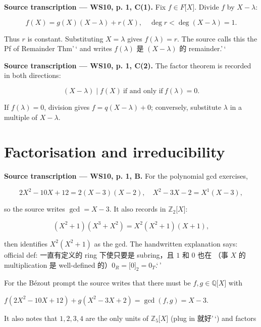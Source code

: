 \textbf{Source transcription --- WS10, p. 1, C(1).} Fix \(f \in F\lbrack X\rbrack\). Divide \(f\) by \(X - \lambda\):

\[f(X) = g(X)\left( {X - \lambda} \right) + r(X),\quad\deg r < \deg\left( {X - \lambda} \right) = 1.\]

Thus \(r\) is constant. Substituting \(X = \lambda\) gives \(f(\lambda) = r\). The source calls this the Pf of Remainder Thm'\,` and writes \(f(\lambda)\) 是 \(\left( {X - \lambda} \right)\) 的 remainder.'\,`

\textbf{Source transcription --- WS10, p. 1, C(2).} The factor theorem is recorded in both directions:

\[\left. \left( {X - \lambda} \right) \middle| f(X)\ \text{if and only if}\ f(\lambda) = 0. \right.\]

If \(f(\lambda) = 0\), division gives \(f = q\left( {X - \lambda} \right) + 0\); conversely, substitute \(\lambda\) in a multiple of \(X - \lambda\).

\section{Factorisation and irreducibility}

\textbf{Source transcription --- WS10, p. 1, B.} For the polynomial gcd exercises,

\[2X^{2} - 10X + 12 = 2\left( {X - 3} \right)\left( {X - 2} \right),\quad X^{2} - 3X - 2 = X^{1}\left( {X - 3} \right),\]

so the source writes \(\gcd = X - 3\). It also records in \(\mathbb{Z}_{2}\lbrack X\rbrack\):

\[\left( {X^{2} + 1} \right)\left( {X^{3} + X^{2}} \right) = X^{2}\left( {X^{2} + 1} \right)\left( {X + 1} \right),\]

then identifies \(X^{2}\left( {X^{2} + 1} \right)\) as the gcd. The handwritten explanation says: official def: 一直有定义的 ring 下使只要是 subring，且 \(1\) 和 \(0\) 也在 （事 \(X\) 的 multiplication 是 well-defined 的）\(0_{R} = \lbrack 0\rbrack_{2} = 0_{T}\).`\,'

For the Bézout prompt the source writes that there must be \(f,g \in \mathbb{Q}\lbrack X\rbrack\) with

\(f\left( {2X^{2} - 10X + 12} \right) + g\left( {X^{2} - 3X + 2} \right) = \gcd\left( {f,g} \right) = X - 3.\)

It also notes that \(1,2,3,4\) are the only units of \(\mathbb{Z}_{5}\lbrack X\rbrack\) (plug in 就好'\,`) and factors

